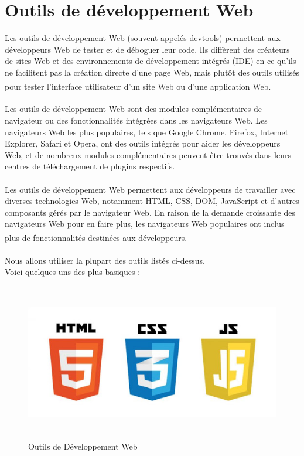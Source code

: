 \documentclass[12pt]{report}
\begin{document}
\newpage

\section{Outils de développement Web}
\vspace{0.2in}
Les outils de développement Web (souvent appelés devtools) permettent aux développeurs Web de tester et de déboguer leur code. Ils diffèrent des créateurs de sites Web et des environnements de développement intégrés (IDE) en ce qu'ils ne facilitent pas la création directe d'une page Web, mais plutôt des outils utilisés pour tester l'interface utilisateur d'un site Web ou d'une application Web.\textsuperscript{\cite{berners2001semantic}}
\\\\
Les outils de développement Web sont des modules complémentaires de navigateur ou des fonctionnalités intégrées dans les navigateurs Web. Les navigateurs Web les plus populaires, tels que Google Chrome, Firefox, Internet Explorer, Safari et Opera, ont des outils intégrés pour aider les développeurs Web, et de nombreux modules complémentaires peuvent être trouvés dans leurs centres de téléchargement de plugins respectifs.
\\\\
Les outils de développement Web permettent aux développeurs de travailler avec diverses technologies Web, notamment HTML, CSS, DOM, JavaScript et d'autres composants gérés par le navigateur Web. En raison de la demande croissante des navigateurs Web pour en faire plus, les navigateurs Web populaires ont inclus plus de fonctionnalités destinées aux développeurs.\textsuperscript{\cite{robbins2012learning}\cite{osmani2012learning}}
\\\\
Nous allons utiliser la plupart des outils listés ci-dessus.
\\
Voici quelques-uns des plus basiques :

\vspace{0.2in}

\begin{figure}[h]
\centering
    \includegraphics[width = 6in, height = 2.7in]{../Images/webDevTools.jpg}
\caption{Outils de Développement Web}
\end{figure}
\end{document}
